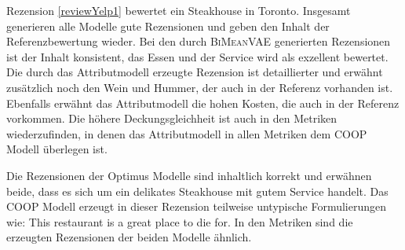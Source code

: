 Rezension \ref{reviewYelp1} bewertet ein Steakhouse in Toronto. 
Insgesamt generieren alle Modelle gute Rezensionen und geben den Inhalt der Referenzbewertung wieder. 
Bei den durch \textsc{BiMeanVAE} generierten Rezensionen ist der Inhalt konsistent, das Essen und der Service wird als exzellent bewertet.
Die durch das Attributmodell erzeugte Rezension ist detaillierter und erwähnt zusätzlich noch den Wein und Hummer, der auch in der Referenz vorhanden ist. Ebenfalls erwähnt das Attributmodell die hohen Kosten, die auch in der Referenz vorkommen.
Die höhere Deckungsgleichheit ist auch in den Metriken wiederzufinden, in denen das Attributmodell in allen Metriken dem COOP Modell überlegen ist. 

Die Rezensionen der Optimus Modelle sind inhaltlich korrekt und erwähnen beide, dass es sich um ein delikates Steakhouse mit gutem Service handelt.
Das COOP Modell erzeugt in dieser Rezension teilweise untypische Formulierungen wie: \glqq{}This restaurant is a great place to die for\grqq{}.
In den Metriken sind die erzeugten Rezensionen der beiden Modelle ähnlich.

